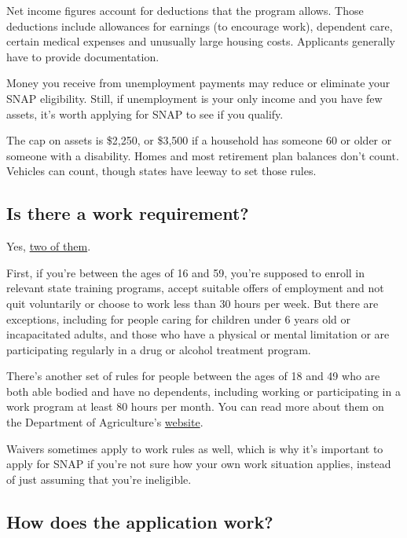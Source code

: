 Net income figures account for deductions that the program allows. Those
deductions include allowances for earnings (to encourage work),
dependent care, certain medical expenses and unusually large housing
costs. Applicants generally have to provide documentation.

Money you receive from unemployment payments may reduce or eliminate
your SNAP eligibility. Still, if unemployment is your only income and
you have few assets, it's worth applying for SNAP to see if you qualify.

The cap on assets is \$2,250, or \$3,500 if a household has someone 60
or older or someone with a disability. Homes and most retirement plan
balances don't count. Vehicles can count, though states have leeway to
set those rules.

\hypertarget{is-there-a-work-requirement}{%
\subsection{Is there a work
requirement?}\label{is-there-a-work-requirement}}

Yes, \href{https://www.fns.usda.gov/snap/work-requirements}{two of
them}.

First, if you're between the ages of 16 and 59, you're supposed to
enroll in relevant state training programs, accept suitable offers of
employment and not quit voluntarily or choose to work less than 30 hours
per week. But there are exceptions, including for people caring for
children under 6 years old or incapacitated adults, and those who have a
physical or mental limitation or are participating regularly in a drug
or alcohol treatment program.

There's another set of rules for people between the ages of 18 and 49
who are both able bodied and have no dependents, including working or
participating in a work program at least 80 hours per month. You can
read more about them on the Department of Agriculture's
\href{https://www.fns.usda.gov/snap/work-requirements-policies}{website}.

Waivers sometimes apply to work rules as well, which is why it's
important to apply for SNAP if you're not sure how your own work
situation applies, instead of just assuming that you're ineligible.

\hypertarget{how-does-the-application-work}{%
\subsection{How does the application
work?}\label{how-does-the-application-work}}

